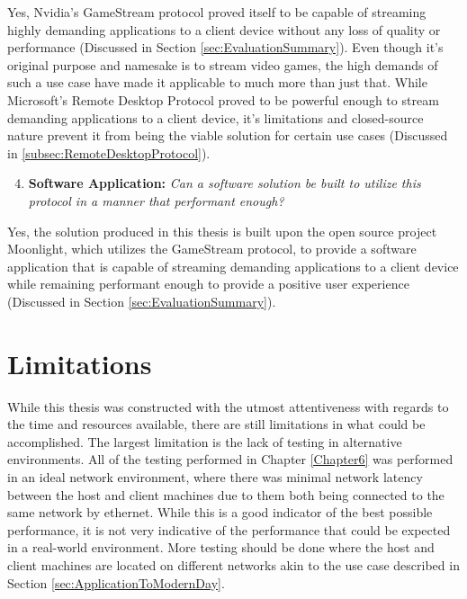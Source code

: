 \noindent
Yes, Nvidia's GameStream protocol proved itself to be capable of streaming highly demanding applications to a client device without any loss of quality or performance (Discussed in Section \ref{sec:EvaluationSummary}).
Even though it's original purpose and namesake is to stream video games, the high demands of such a use case have made it applicable to much more than just that.
While Microsoft's Remote Desktop Protocol proved to be powerful enough to stream demanding applications to a client device, it's limitations and closed-source nature prevent it from being the viable solution for certain use cases (Discussed in \ref{subsec:RemoteDesktopProtocol}).

\begin{enumerate}
  \setcounter{enumi}{3} %
  \item \textbf{Software Application:} \emph{Can a software solution be built to utilize this protocol in a manner that performant enough?}
\end{enumerate}

\noindent
Yes, the solution produced in this thesis is built upon the open source project Moonlight, which utilizes the GameStream protocol, to provide a software application that is capable of streaming demanding applications to a client device while remaining performant enough to provide a positive user experience (Discussed in Section \ref{sec:EvaluationSummary}).


\section{Limitations}\label{sec:ConclusionLimitations}

While this thesis was constructed with the utmost attentiveness with regards to the time and resources available, there are still limitations in what could be accomplished.
The largest limitation is the lack of testing in alternative environments.
All of the testing performed in Chapter \ref{Chapter6} was performed in an ideal network environment, where there was minimal network latency between the host and client machines due to them both being connected to the same network by ethernet.
While this is a good indicator of the best possible performance, it is not very indicative of the performance that could be expected in a real-world environment.
More testing should be done where the host and client machines are located on different networks akin to the use case described in Section \ref{sec:ApplicationToModernDay}.

